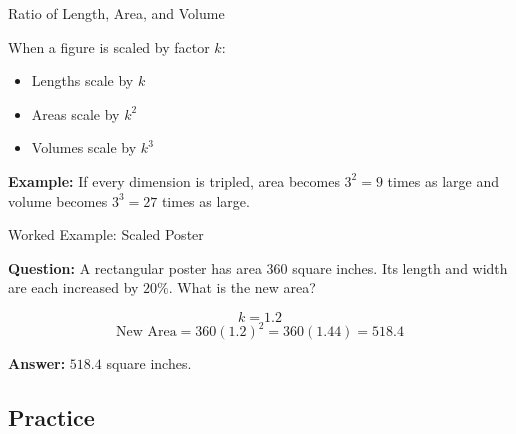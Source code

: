 \documentclass{beamer}
\begin{document}
\begin{frame}{Ratio of Length, Area, and Volume}

When a figure is scaled by factor $k$:
\begin{itemize}
    \item Lengths scale by $k$
    \item Areas scale by $k^2$
    \item Volumes scale by $k^3$
\end{itemize}

\vspace{0.2cm}
\textbf{Example:} If every dimension is tripled, area becomes $3^2=9$ times as large and volume becomes $3^3=27$ times as large.

\end{frame}

\begin{frame}{Worked Example: Scaled Poster}

\textbf{Question:} A rectangular poster has area $360$ square inches. Its length and width are each increased by $20\%$. What is the new area?

\vspace{0.2cm}
\[
k=1.2
\]
\[
\text{New Area}=360(1.2)^2 = 360(1.44)=518.4
\]

\textbf{Answer:} $\boxed{518.4}$ square inches.

\end{frame}

\begin{frame}
\section{Practice}
\end{frame}
\end{document}
